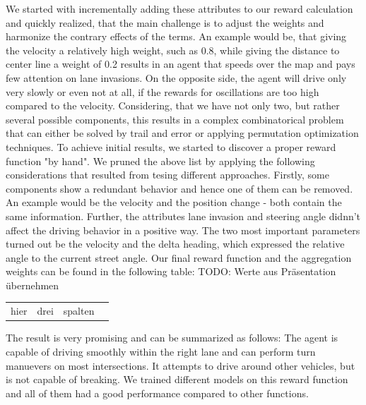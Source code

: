 \documentclass[letterpaper, 10 pt, conference]{ieeeconf}  %
\begin{document}
We started with incrementally adding these attributes to our reward calculation and quickly realized, that the main challenge is to adjust the weights and harmonize the contrary effects of the terms.
An example would be, that giving the velocity a relatively high weight, such as 0.8, while giving the distance to center line a weight of 0.2 results in an agent that speeds over the map and pays few attention on lane invasions. On the opposite side, the agent will drive only very slowly or even not at all, if the rewards for oscillations are too high compared to the velocity. Considering, that we have not only two, but rather several possible components, this results in a complex combinatorical problem that can either be solved by trail and error or applying permutation optimization techniques. To achieve initial results, we started to discover a proper reward function "by hand". 
\newline
We pruned the above list by applying the following considerations that resulted from tesing different approaches. Firstly, some components show a redundant behavior and hence one of them can be removed. An example would be the velocity and the position change - both contain the same information. Further, the attributes lane invasion and steering angle didnn't affect the driving behavior in a positive way. The two most important parameters turned out be the velocity and the delta heading, which expressed the relative angle to the current street angle. Our final reward function and the aggregation weights can be found in the following table:
\newline
TODO: Werte aus Präsentation übernehmen
\begin{tabular}{ | l | l | l | p{5cm} |}
	\hline
	hier & drei & spalten
\end{tabular}
\newline

The result is very promising and can be summarized as follows: The agent is capable of driving smoothly within the right lane and can perform turn manuevers on most intersections. It attempts to drive around other vehicles, but is not capable of breaking. We trained different models on this reward function and all of them had a good performance compared to other functions.
\end{document}

